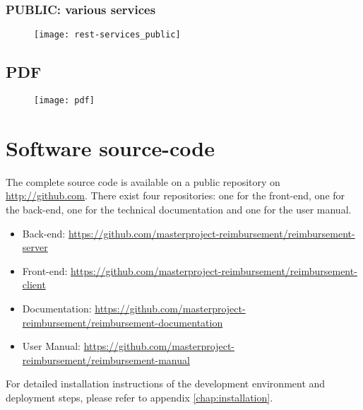 \subsection{PUBLIC: various services}
\begin{figure}[H]
    {\texttt{[image: rest-services\_public]}}
\end{figure}
\newpage

\section{PDF}
\label{sec:app-pdf}

\begin{figure}[H]
    {\texttt{[image: pdf]}}
\end{figure}
\newpage

\chapter{Software source-code}
\label{github-source}

The complete source code is available on a public repository on \url{http://github.com}. There exist four repositories: one for the front-end, one for the back-end, one for the technical documentation and one for the user manual.

\begin{itemize}
    \item Back-end: \newline \url{https://github.com/masterproject-reimbursement/reimbursement-server}
    \item Front-end: \newline \url{https://github.com/masterproject-reimbursement/reimbursement-client}
    \item Documentation: \newline \url{https://github.com/masterproject-reimbursement/reimbursement-documentation}
    \item User Manual: \newline \url{https://github.com/masterproject-reimbursement/reimbursement-manual}
\end{itemize}

For detailed installation instructions of the development environment and deployment steps, please refer to appendix \ref{chap:installation}.
